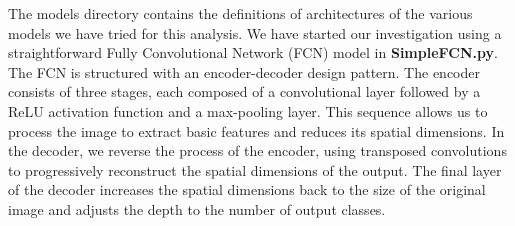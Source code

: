 \documentclass[a4paper,11pt]{article}
\begin{document}
The models directory contains the definitions of architectures of the various models we have tried for this analysis. We have started our investigation using a straightforward Fully Convolutional Network (FCN) model in \textbf{SimpleFCN.py}. The FCN is structured with an encoder-decoder design pattern. The encoder consists of three stages, each composed of a convolutional layer followed by a ReLU activation function and a max-pooling layer. This sequence allows us to process the image to extract basic features and reduces its spatial dimensions. In the decoder, we reverse the process of the encoder, using transposed convolutions to progressively reconstruct the spatial dimensions of the output. The final layer of the decoder increases the spatial dimensions back to the size of the original image and adjusts the depth to the number of output classes. 
\end{document}
